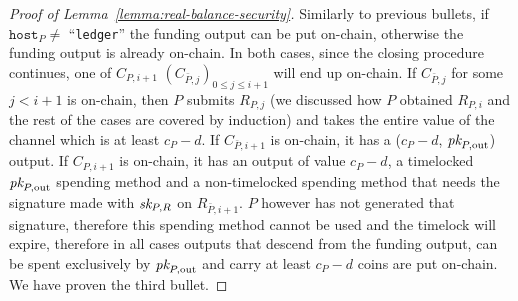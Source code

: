 \begin{proof}[Proof of Lemma~\ref{lemma:real-balance-security}]
  Similarly to previous bullets, if $\mathtt{host}_P \neq$ ``\texttt{ledger}'' the funding
  output can be put on-chain, otherwise the funding output is already on-chain.
  In both cases, since the closing procedure continues, one of $C_{P, i+1}$
  $(C_{\bar{P}, j})_{0 \leq j \leq i+1}$ will end up on-chain. If $C_{\bar{P},
  j}$ for some $j < i+1$ is on-chain, then $P$ submits $R_{P, j}$ (we discussed
  how $P$ obtained $R_{P, i}$ and the rest of the cases are covered by
  induction) and takes the entire value of the channel which is at least $c_P -
  d$. If $C_{\bar{P}, i+1}$ is on-chain, it has a ($c_P - d$, $\textit{pk}_{P,
  \mathrm{out}}$) output. If $C_{P, i+1}$ is on-chain, it has an output of value
  $c_P - d$, a timelocked $\textit{pk}_{P, \mathrm{out}}$ spending method and a
  non-timelocked spending method that needs the signature made with $\textit{sk}_{P, R}$
  on $R_{\bar{P}, i+1}$. $P$ however has not generated that signature, therefore
  this spending method cannot be used and the timelock will expire, therefore in
  all cases outputs that descend from the funding output, can be spent
  exclusively by $\textit{pk}_{P, \mathrm{out}}$ and carry at least $c_P - d$ coins are
  put on-chain. We have proven the third bullet.


\end{proof}
